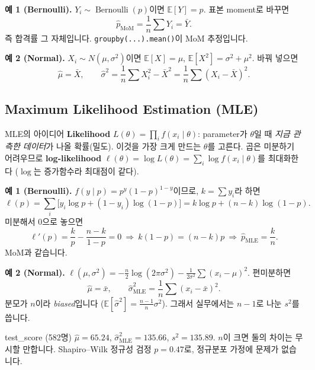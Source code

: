 \documentclass[11pt,a4paper]{article}
\newcommand{\E}{\mathbb{E}}
\newcommand{\Bern}{\operatorname{Bernoulli}}
\newcommand{\term}[1]{\textbf{#1}}
\newcommand{\code}[1]{\texttt{#1}}
\begin{document}
\textbf{예 1 (Bernoulli).} $Y_i\sim\Bern(p)$이면 $\E[Y]=p$. 표본 moment로 바꾸면
\[
\hat p_{\text{MoM}}=\frac1n\sum Y_i=\bar Y.
\]
즉 합격률 그 자체입니다. \code{groupby(...).mean()}이 MoM 추정입니다.

\textbf{예 2 (Normal).} $X_i\sim N(\mu,\sigma^2)$이면 $\E[X]=\mu$, $\E[X^2]=\sigma^2+\mu^2$. 바꿔 넣으면
\[
\hat\mu=\bar X,\qquad \hat\sigma^2=\frac1n\sum X_i^2-\bar X^2=\frac1n\sum(X_i-\bar X)^2.
\]

\subsection{Maximum Likelihood Estimation (MLE)}
\begin{defbox}{MLE의 아이디어}
\term{Likelihood} $L(\theta)=\prod_i f(x_i\mid\theta)$: parameter가 $\theta$일 때 \emph{지금 관측한 데이터}가 나올 확률(밀도). 이것을 가장 크게 만드는 $\theta$를 고른다. 곱은 미분하기 어려우므로 \term{log-likelihood} $\ell(\theta)=\log L(\theta)=\sum_i\log f(x_i\mid\theta)$를 최대화한다 ($\log$는 증가함수라 최대점이 같다).
\end{defbox}

\textbf{예 1 (Bernoulli).} $f(y\mid p)=p^y(1-p)^{1-y}$이므로, $k=\sum y_i$라 하면
\[
\ell(p)=\sum_i\big[y_i\log p+(1-y_i)\log(1-p)\big]=k\log p+(n-k)\log(1-p).
\]
미분해서 0으로 놓으면
\[
\ell'(p)=\frac kp-\frac{n-k}{1-p}=0\ \Longrightarrow\ k(1-p)=(n-k)p\ \Longrightarrow\ \hat p_{\text{MLE}}=\frac kn.
\]
MoM과 같습니다.

\textbf{예 2 (Normal).} $\ell(\mu,\sigma^2)=-\frac n2\log(2\pi\sigma^2)-\frac1{2\sigma^2}\sum(x_i-\mu)^2$. 편미분하면
\[
\hat\mu=\bar x,\qquad \hat\sigma^2_{\text{MLE}}=\frac1n\sum(x_i-\bar x)^2.
\]
분모가 $n$이라 \emph{biased}입니다 ($\E[\hat\sigma^2]=\frac{n-1}n\sigma^2$). 그래서 실무에서는 $n-1$로 나눈 $s^2$를 씁니다.

\begin{databox}{test\_score (582명)}
$\hat\mu=65.24$, $\hat\sigma^2_{\text{MLE}}=135.66$, $s^2=135.89$. $n$이 크면 둘의 차이는 무시할 만합니다. Shapiro–Wilk 정규성 검정 $p=0.47$로, 정규분포 가정에 문제가 없습니다.
\end{databox}
\end{document}
